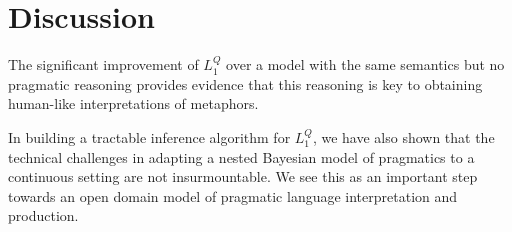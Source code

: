 \documentclass[OpenMind]{stjour}
\newcommand{\Listener}{L}
\newcommand{\QLONE}{\Listener_{{1}}^{{Q}}}
\begin{document}
\section{Discussion} \label{conc} 


	The significant improvement of $\QLONE$ over a model with the same semantics but no pragmatic reasoning provides evidence that this reasoning is key to obtaining human-like interpretations of metaphors.

	In building a tractable inference algorithm for $\QLONE$, we have also shown that the technical challenges in adapting a nested Bayesian model of pragmatics to a continuous setting are not insurmountable. We see this as an important step towards an open domain model of pragmatic language interpretation and production.





	
\end{document}
